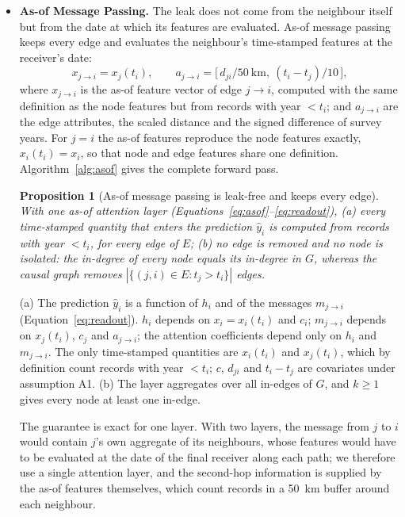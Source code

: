 \documentclass[a4paper,fleqn]{cas-sc}
\newtheorem{proposition}{Proposition}
\begin{document}
\begin{itemize}[leftmargin=1.4em]
\item \textbf{As-of Message Passing.} The leak does not come from the neighbour itself but from the date at which its features are evaluated. As-of message passing keeps every edge and evaluates the neighbour's time-stamped features at the receiver's date:
\begin{equation}
x_{j \to i} = x_j(t_i), \qquad a_{j \to i} = \big[\,d_{ji}/50\ \text{km},\ (t_i - t_j)/10\,\big],
\label{eq:asof}
\end{equation}
where $x_{j \to i}$ is the as-of feature vector of edge $j \to i$, computed with the same definition as the node features but from records with year $< t_i$; and $a_{j \to i}$ are the edge attributes, the scaled distance and the signed difference of survey years. For $j = i$ the as-of features reproduce the node features exactly, $x_i(t_i) = x_i$, so that node and edge features share one definition. Algorithm~\ref{alg:asof} gives the complete forward pass.

\begin{proposition}[As-of message passing is leak-free and keeps every edge]
\label{prop:asof}
With one as-of attention layer (Equations~\eqref{eq:asof}--\eqref{eq:readout}), (a) every time-stamped quantity that enters the prediction $\hat{y}_i$ is computed from records with year $< t_i$, for every edge of $E$; (b) no edge is removed and no node is isolated: the in-degree of every node equals its in-degree in $G$, whereas the causal graph removes $|\{(j,i) \in E : t_j > t_i\}|$ edges.
\end{proposition}

\begin{pf}
(a) The prediction $\hat{y}_i$ is a function of $h_i$ and of the messages $m_{j \to i}$ (Equation~\eqref{eq:readout}). $h_i$ depends on $x_i = x_i(t_i)$ and $c_i$; $m_{j \to i}$ depends on $x_j(t_i)$, $c_j$ and $a_{j \to i}$; the attention coefficients depend only on $h_i$ and $m_{j \to i}$. The only time-stamped quantities are $x_i(t_i)$ and $x_j(t_i)$, which by definition count records with year $< t_i$; $c$, $d_{ji}$ and $t_i - t_j$ are covariates under assumption A1. (b) The layer aggregates over all in-edges of $G$, and $k \geq 1$ gives every node at least one in-edge.
\end{pf}

The guarantee is exact for one layer. With two layers, the message from $j$ to $i$ would contain $j$'s own aggregate of its neighbours, whose features would have to be evaluated at the date of the final receiver along each path; we therefore use a single attention layer, and the second-hop information is supplied by the as-of features themselves, which count records in a 50~km buffer around each neighbour.


\end{itemize}
\end{document}
